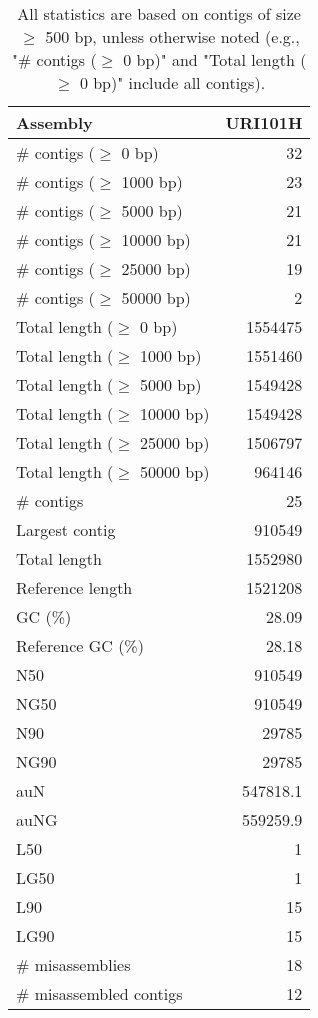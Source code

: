\documentclass[12pt,a4paper]{article}
\begin{document}
\begin{table}[ht]
\begin{center}
\caption{All statistics are based on contigs of size $\geq$ 500 bp, unless otherwise noted (e.g., "\# contigs ($\geq$ 0 bp)" and "Total length ($\geq$ 0 bp)" include all contigs).}
\begin{tabular}{|l*{1}{|r}|}
\hline
Assembly & URI101H \\ \hline
\# contigs ($\geq$ 0 bp) & 32 \\ \hline
\# contigs ($\geq$ 1000 bp) & 23 \\ \hline
\# contigs ($\geq$ 5000 bp) & 21 \\ \hline
\# contigs ($\geq$ 10000 bp) & 21 \\ \hline
\# contigs ($\geq$ 25000 bp) & 19 \\ \hline
\# contigs ($\geq$ 50000 bp) & 2 \\ \hline
Total length ($\geq$ 0 bp) & 1554475 \\ \hline
Total length ($\geq$ 1000 bp) & 1551460 \\ \hline
Total length ($\geq$ 5000 bp) & 1549428 \\ \hline
Total length ($\geq$ 10000 bp) & 1549428 \\ \hline
Total length ($\geq$ 25000 bp) & 1506797 \\ \hline
Total length ($\geq$ 50000 bp) & 964146 \\ \hline
\# contigs & 25 \\ \hline
Largest contig & 910549 \\ \hline
Total length & 1552980 \\ \hline
Reference length & 1521208 \\ \hline
GC (\%) & 28.09 \\ \hline
Reference GC (\%) & 28.18 \\ \hline
N50 & 910549 \\ \hline
NG50 & 910549 \\ \hline
N90 & 29785 \\ \hline
NG90 & 29785 \\ \hline
auN & 547818.1 \\ \hline
auNG & 559259.9 \\ \hline
L50 & 1 \\ \hline
LG50 & 1 \\ \hline
L90 & 15 \\ \hline
LG90 & 15 \\ \hline
\# misassemblies & 18 \\ \hline
\# misassembled contigs & 12 \\ \hline

\end{tabular}
\end{center}
\end{table}
\end{document}
